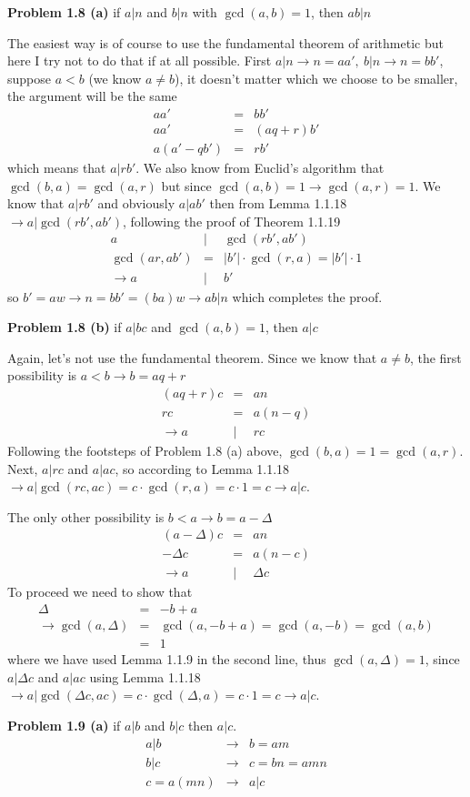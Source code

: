 \documentclass[aps,preprint,preprintnumbers,nofootinbib,showpacs,prd]{revtex4-1}
\newcommand{\nbea}{\begin{eqnarray*}}
\newcommand{\neea}{\end{eqnarray*}}
\begin{document}
{\bf Problem 1.8 (a)} if $a|n$ and $b|n$ with $\gcd(a,b)=1$, then $ab|n$

The easiest way is of course to use the fundamental theorem of arithmetic but here I try not to do that if at all possible. First $a|n \to n = aa',~b|n \to n = bb'$, suppose $a < b$ (we know $a \neq b$), it doesn't matter which we choose to be smaller, the argument will be the same
%
\nbea
aa' & = & bb' \\
aa' & = & (aq + r) b' \\
a (a' - qb') & = & rb'
\neea
%
which means that $a | rb'$. We also know from Euclid's algorithm that $\gcd(b,a) = \gcd(a, r)$ but since $\gcd(a,b) = 1 \to \gcd(a,r)=1$. We know that $a|rb'$ and obviously $a|ab'$ then from Lemma 1.1.18 $\to a|\gcd(rb',ab')$, following the proof of Theorem 1.1.19
%
\nbea
a & | & \gcd(rb',ab') \\
\gcd(ar,ab') & = & |b'| \cdot \gcd(r,a) = |b'| \cdot 1 \\
\to a & | & b'
\neea
%
so $b' = a w \to n = bb' = (b a) w \to ab | n$ which completes the proof.

{\bf Problem 1.8 (b)} if $a|bc$ and $\gcd(a,b) = 1$, then $a|c$

Again, let's not use the fundamental theorem. Since we know that $a \neq b$, the first possibility is $a < b \to b = aq + r$
%
\nbea
(aq+r)c & = & an \\
rc & = & a(n-q) \\
\to a & | & rc
\neea
%
Following the footsteps of Problem 1.8 (a) above, $\gcd(b,a) = 1 = \gcd(a,r)$. Next, $a|rc$ and $a|ac$, so according to Lemma 1.1.18 $\to a|\gcd(rc,ac) = c \cdot \gcd(r,a) = c \cdot 1 = c \to a | c$.

The only other possibility is $b < a \to b = a - \Delta$
%
\nbea
(a - \Delta)c & = & an \\
-\Delta c & = & a(n-c) \\
\to a & | & \Delta c
\neea
%
To proceed we need to show that
%
\nbea
\Delta & = & - b + a\\
\to \gcd(a,\Delta) & = & \gcd(a, - b + a) = \gcd(a,-b) = \gcd(a,b)\\
& = & 1
\neea
%
where we have used Lemma 1.1.9 in the second line, thus $\gcd(a,\Delta) = 1$, since $a|\Delta c$ and $a|ac$ using Lemma 1.1.18 $\to a|\gcd(\Delta c,ac) = c \cdot \gcd(\Delta,a) = c \cdot 1 = c \to a|c$.

{\bf Problem 1.9 (a)} if $a|b$ and $b|c$ then $a|c$.
%
\nbea
a|b & \to & b = a m \\
b|c & \to & c = b n = a mn \\
c = a(mn) & \to & a|c
\neea
%
\end{document}
